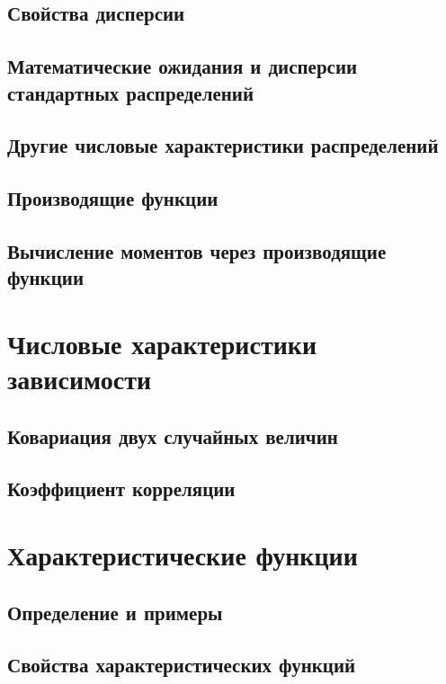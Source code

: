 \subsection{Свойства дисперсии}


\subsection{Математические ожидания и дисперсии стандартных распределений}


\subsection{Другие числовые характеристики распределений}


\subsection{Производящие функции}


% 

\subsection{Вычисление моментов через производящие функции}




\section{Числовые характеристики зависимости}

\subsection{Ковариация двух случайных величин}


\subsection{Коэффициент корреляции}





\section{Характеристические функции}

\subsection{Определение и примеры}


\subsection{Свойства характеристических функций}
